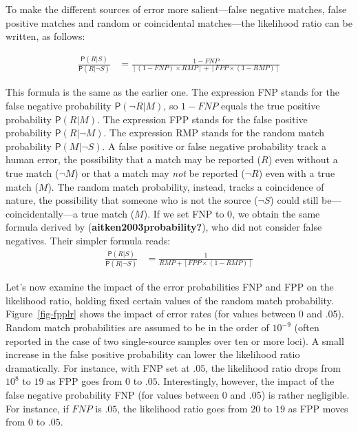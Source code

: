 \documentclass[
  letterpaper,
  DIV=11,
  numbers=noendperiod]{scrartcl}
\newcommand{\n}{\neg}
\newcommand{\pr}[1]{\mathsf{P}(#1)}
\begin{document}
To make the different sources of error more salient---false negative
matches, false positive matches and random or coincidental matches---the
likelihood ratio can be written, as follows:

\begin{align}
\label{eq:LRfp4b}
\frac{\pr{R \vert S}}{\pr{R \vert \neg S}} & = \frac{1-FNP}{[(1-FNP)\times RMP] + [ FPP \times (1-RMP)]}
\end{align}

\noindent This formula is the same as the earlier one. The expression
FNP stands for the false negative probability \(\pr{\neg R \vert M}\),
so \(1-FNP\) equals the true positive probability \(\pr{R \vert M}\).
The expression FPP stands for the false positive probability
\(\pr{R \vert \n M}\). The expression RMP stands for the random match
probability \(\pr{M\vert \n S}\). A false positive or false negative
probability track a human error, the possibility that a match may be
reported (\(R\)) even without a true match (\(\neg M\)) or that a match
may \textit{not} be reported (\(\neg R\)) even with a true match
(\(M\)). The random match probability, instead, tracks a coincidence of
nature, the possibility that someone who is not the source (\(\neg S\))
could still be---coincidentally---a true match (\(M\)). If we set FNP to
0, we obtain the same formula derived by
(\textbf{aitken2003probability?}), who did not consider false negatives.
Their simpler formula reads: \begin{align*}
\frac{\pr{R \vert S}}{\pr{R \vert \neg S}} & = \frac{1}{RMP + [ FPP \times (1-RMP)]}
\end{align*}

Let's now examine the impact of the error probabilities FNP and FPP on
the likelihood ratio, holding fixed certain values of the random match
probability. Figure~\ref{fig-fpplr} shows the impact of error rates (for
values between 0 and .05). Random match probabilities are assumed to be
in the order of \(10^{-9}\) (often reported in the case of two
single-source samples over ten or more loci). A small increase in the
false positive probability can lower the likelihood ratio dramatically.
For instance, with FNP set at \(.05\), the likelihood ratio drops from
\(10^8\) to \(19\) as FPP goes from 0 to \(.05\). Interestingly,
however, the impact of the false negative probability FNP (for values
between 0 and .05) is rather negligible. For instance, if \(FNP\) is
\(.05\), the likelihood ratio goes from \(20\) to \(19\) as FPP moves
from \(0\) to \(.05\).
\end{document}

